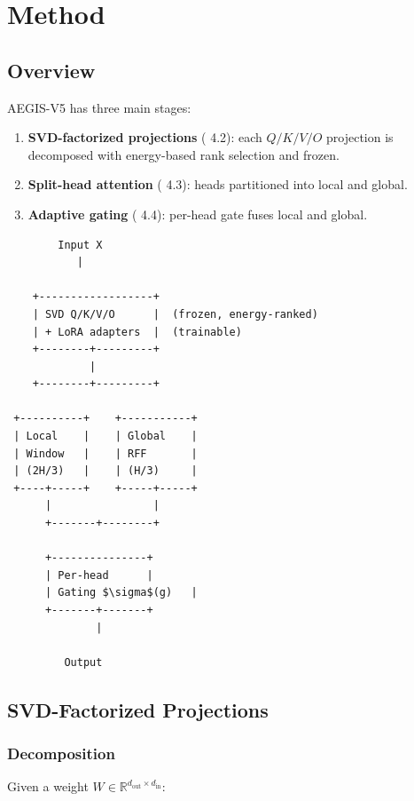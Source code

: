 \section{Method}

\subsection{Overview}

AEGIS-V5 has three main stages:

\begin{enumerate}
\item \textbf{SVD-factorized projections} ( 4.2): each $Q/K/V/O$ projection is
  decomposed with energy-based rank selection and frozen.
\item \textbf{Split-head attention} ( 4.3): heads partitioned into local and global.
\item \textbf{Adaptive gating} ( 4.4): per-head gate fuses local and global.

\end{enumerate}
\begin{lstlisting}
        Input X
           |
            
    +------------------+
    | SVD Q/K/V/O      |  (frozen, energy-ranked)
    | + LoRA adapters  |  (trainable)
    +--------+---------+
             |
    +--------+---------+
                        
 +----------+    +-----------+
 | Local    |    | Global    |
 | Window   |    | RFF       |
 | (2H/3)   |    | (H/3)     |
 +----+-----+    +-----+-----+
      |                |
      +-------+--------+
               
      +---------------+
      | Per-head      |
      | Gating $\sigma$(g)   |
      +-------+-------+
              |
               
         Output
\end{lstlisting}

\subsection{SVD-Factorized Projections}

\subsubsection{Decomposition}

Given a weight $W \in \mathbb{R}^{d_\text{out} \times d_\text{in}}$:

